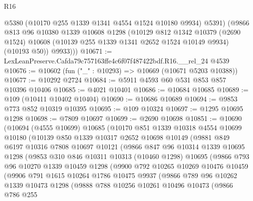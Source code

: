 \begin{lexlean}{R16}
\begin{coremodule}
          @5380
          (@10170 @255 @1339 @1341 @4554 @1524 @10180 @9934)
          @5391)
        (@9866
          @813
          @96
          @10380
          @1339
          @10608
          @1298
          (@10129
            @812
            @1342
            @10379
            (@2690 @1524)
            @10608
            (@10139 @255 @1339 @1341 @2652 @1524 @10149 @9934)
            (@10193 @50))
          @9933)))
@10671 := LexLeanPreserve.Cafda79c757163ffe4c6f07f487422bdf.R16.__rel_24 @4539
@10676 := @10602 (fun ("_" : @10293) => @10669 (@10671 @5203 @10388))
@10677 := @10292 @2724
@10684 := @5911 @4593 @60 @531 @853 @857 @10396 @10406
@10685 := @4021 @10401
@10686 := @10684 @10685
@10689 := @109 (@10411 @10402 @10404)
@10690 := @10686 @10689
@10694 := @9853 @773 @852 @10319 @10395
@10695 := @109 @10324
@10697 := @1295 @10695 @1298
@10698 := @7809 @10697
@10699 := @2690 @10698
@10851 := @10690
    (@10694
      (@4555 @10699)
      @10685
      (@10170
        @851
        @1339
        @10318
        @4554
        @10699
        @10180
        (@10139
          @850
          @1339
          @10317
          @2652
          @10698
          @10149
          (@9881
            @849
            @6197
            @10316
            @7808
            @10697
            @10121
            (@9866
              @847
              @96
              @10314
              @1339
              @10695
              @1298
              (@9853
                @310
                @846
                @10311
                @10313
                (@10460 @1298)
                @10695
                (@9866
                  @793
                  @96
                  @10270
                  @1339
                  @10459
                  @1298
                  (@9900
                    @792
                    @10265
                    @10269
                    @10476
                    @10459
                    (@9906
                      @791
                      @1615
                      @10264
                      @1786
                      @10475
                      @9937
                      (@9866
                        @789
                        @96
                        @10262
                        @1339
                        @10473
                        @1298
                        (@9888
                          @788
                          @10256
                          @10261
                          @10496
                          @10473
                          (@9866
                            @786
                            @255

\end{coremodule}
\end{lexlean}

